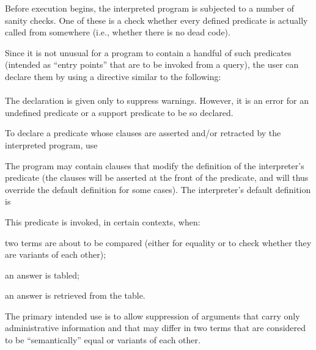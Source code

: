 Before execution begins, the interpreted program is subjected to a number of
sanity checks.  One of these is a check whether every defined predicate is
actually called from somewhere (i.e., whether there is no dead code).

Since it is not unusual for a program to contain a handful of such predicates
(intended as ``entry points'' that are to be invoked from a query),
the user can declare them by using a directive similar to the following:\\
\ind{}\label{dir:top}\\
The declaration is given only to suppress warnings.  However, it is an error
for an undefined predicate or a support predicate to be so declared.




To declare a predicate whose clauses are asserted and/or retracted by the
interpreted program, use\\
\ind{}\label{dir:dynamic}




The program may contain clauses that modify the definition of the
interpreter's predicate  (the clauses will be
asserted at the front of the predicate, and will thus override the default
definition for some cases).  The interpreter's default definition is\\
\ind{}

This predicate is invoked, in certain contexts, when:
\begin{LightItemize}
  \item
    two terms are about to be compared (either for equality or to check
    whether they are variants of each other);
  \item
    an answer is tabled;
  \item
    an answer is retrieved from the table.
\end{LightItemize}

The primary intended use is to allow suppression of arguments that carry only
administrative information and that may differ in two terms that are
considered to be ``semantically'' equal or variants of each other.

